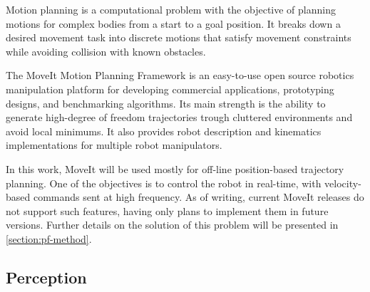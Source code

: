 
\par Motion planning is a computational problem with the objective of planning motions for complex bodies from a start to a goal position. It breaks down a desired movement task into discrete motions that satisfy movement constraints while avoiding collision with known obstacles. 
\par The MoveIt Motion Planning Framework is an easy-to-use open source robotics manipulation platform for developing commercial applications, prototyping designs, and benchmarking algorithms. Its main strength is the ability to generate high-degree of freedom trajectories trough cluttered environments and avoid local minimums. It also provides robot description and kinematics implementations for multiple robot manipulators. 
\par In this work, MoveIt will be used mostly for off-line position-based trajectory planning. One of the objectives is to control the robot in real-time, with velocity-based commands sent at high frequency. As of writing, current MoveIt releases do not support such features, having only plans to implement them in future versions. Further details on the solution of this problem will be presented in \autoref{section:pf-method}.




\subsection{Perception}

